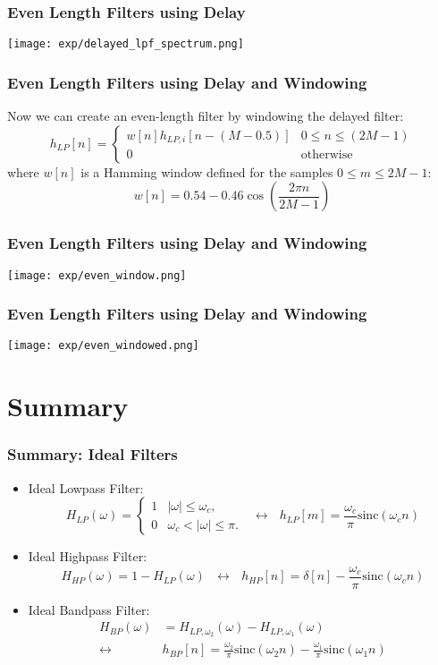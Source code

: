 \documentclass{beamer}
\begin{document}
\begin{frame}
  \frametitle{Even Length Filters using Delay}
  
  \centerline{\texttt{[image: exp/delayed\_lpf\_spectrum.png]}}
\end{frame}

\begin{frame}
  \frametitle{Even Length Filters using Delay and Windowing}

  Now we can create an even-length filter by windowing the delayed filter:
  \[
  h_{LP}[n] = \begin{cases}
    w[n]h_{LP,i}\left[n-(M-0.5)\right] & 0\le n\le (2M-1)\\
    0 &\mbox{otherwise}
  \end{cases}
  \]
  where $w[n]$ is a Hamming window defined for the samples $0\le m\le 2M-1$:
  \[
  w[n] = 0.54 - 0.46 \cos\left(\frac{2\pi n}{2M-1}\right)
  \]
\end{frame}

\begin{frame}
  \frametitle{Even Length Filters using Delay and Windowing}
  \centerline{\texttt{[image: exp/even\_window.png]}}
\end{frame}

\begin{frame}
  \frametitle{Even Length Filters using Delay and Windowing}

  \centerline{\texttt{[image: exp/even\_windowed.png]}}
\end{frame}

\section[Summary]{Summary}
\setcounter{subsection}{1}

\begin{frame}
  \frametitle{Summary: Ideal Filters}
  \begin{itemize}
  \item Ideal Lowpass Filter:
    \[
    H_{LP}(\omega)
    = \begin{cases} 1& |\omega|\le\omega_c,\\
      0 & \omega_c<|\omega|\le\pi.
    \end{cases}~~~\leftrightarrow~~~
    h_{LP}[m]=\frac{\omega_c}{\pi}\mbox{sinc}(\omega_c n)
    \]
  \item Ideal Highpass Filter:
    \[
    H_{HP}(\omega)=1-H_{LP}(\omega)~~~\leftrightarrow~~~
    h_{HP}[n]=\delta[n]-\frac{\omega_c}{\pi}\mbox{sinc}(\omega_c n)
    \]
  \item Ideal Bandpass Filter:
    \begin{align*}
      H_{BP}(\omega)&=H_{LP,\omega_2}(\omega)-H_{LP,\omega_1}(\omega)\\
      \leftrightarrow
      &h_{BP}[n]=\frac{\omega_2}{\pi}\mbox{sinc}(\omega_2 n)-\frac{\omega_1}{\pi}\mbox{sinc}(\omega_1 n)
    \end{align*}
  \end{itemize}
\end{frame}
\end{document}
